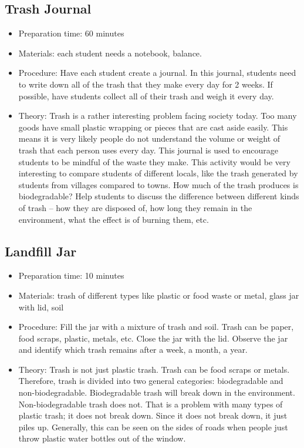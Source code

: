 \subsection{Trash Journal}
\begin{itemize}
\item{Preparation time: 60 minutes}
\item{Materials: each student needs a notebook, balance.}
\item{Procedure: Have each student create a journal. In this journal, students need to write down all of the trash that they make every day for 2 weeks. If possible, have students collect all of their trash and weigh it every day. }
\item{Theory: Trash is a rather interesting problem facing society today. Too many goods have small plastic wrapping or pieces that are cast aside easily. This means it is very likely people do not understand the volume or weight of trash that each person uses every day. This journal is used to encourage students to be mindful of the waste they make. This activity would be very interesting to compare students of different locals, like the trash generated by students from villages compared to towns. How much of the trash produces is biodegradable? Help students to discuss the difference between different kinds of trash – how they are disposed of, how long they remain in the environment, what the effect is of burning them, etc.}
\end{itemize}

\subsection{Landfill Jar}
\begin{itemize}
\item{Preparation time: 10 minutes}
\item{Materials: trash of different types like plastic or food waste or metal, glass jar with lid, soil}
\item{Procedure: Fill the jar with a mixture of trash and soil. Trash can be paper, food scraps, plastic, metals, etc. Close the jar with the lid. Observe the jar and identify which trash remains after a week, a month, a year.}
\item{Theory: Trash is not just plastic trash. Trash can be food scraps or metals. Therefore, trash is divided into two general categories: biodegradable and non-biodegradable. Biodegradable trash will break down in the environment. Non-biodegradable trash does not. That is a problem with many types of plastic trash; it does not break down. Since it does not break down, it just piles up. Generally, this can be seen on the sides of roads when people just throw plastic water bottles out of the window.}
\end{itemize}

